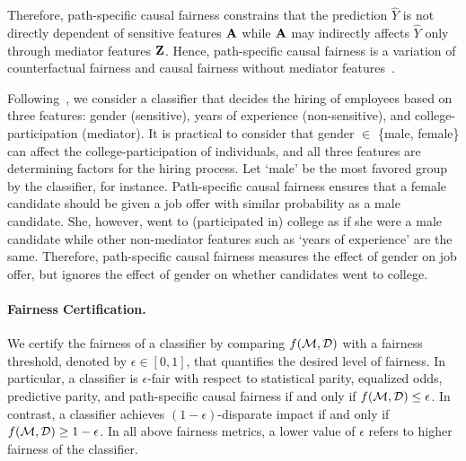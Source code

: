 Therefore, path-specific causal fairness constrains that the prediction $ \widehat{Y} $ is not directly dependent of sensitive features $ \mathbf{A} $ while $ \mathbf{A} $ may indirectly affects $ \widehat{Y} $ only through mediator features $ \mathbf{Z} $. Hence, path-specific causal fairness is a variation of counterfactual fairness and causal fairness without mediator features~\cite{bastani2019probabilistic}. 




\begin{example}
	\normalfont
	Following~\cite{bastani2019probabilistic}, we consider a classifier that decides the hiring of employees based on three features: gender (sensitive), years of experience (non-sensitive), and college-participation (mediator). It is practical to consider that gender $ \in $ \{male, female\} can affect the college-participation of individuals, and all three features are determining factors for the hiring process. Let `male' be the most favored group by the classifier, for instance. Path-specific causal fairness ensures that a female candidate should be given a job offer with similar probability as a male candidate. She,  however,  went to (participated in) college as if she were a male candidate while other non-mediator features such as  `years of experience' are the same.  Therefore, path-specific causal fairness measures the effect of gender on job offer, but ignores the effect of gender on whether candidates went to college.
\end{example}	



\paragraph{Fairness Certification.} We certify the fairness of a classifier by comparing $ f(\mathcal{M}, \mathcal{D}) $ with a fairness threshold, denoted by $ \epsilon \in [0,1] $, that quantifies the desired level of fairness. In particular, a classifier is $ \epsilon $-fair with respect to statistical parity, equalized odds, predictive parity, and path-specific causal fairness if and only if $ f(\mathcal{M}, \mathcal{D}) \le \epsilon $. In contrast, a classifier achieves $(1 - \epsilon)$-disparate impact  if and only if $ f(\mathcal{M}, \mathcal{D}) \ge 1 - \epsilon $. In all above fairness metrics, a lower value of $ \epsilon $ refers to higher fairness of the classifier.


